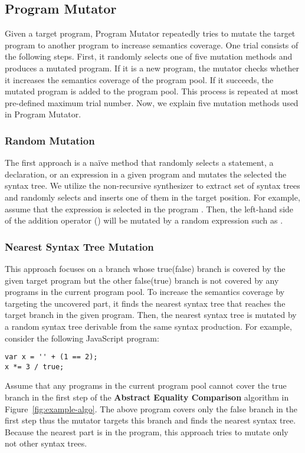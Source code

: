 \subsection{Program Mutator}

Given a target program, \textsf{Program Mutator} repeatedly tries to mutate the
target program to another program to increase semantics coverage.  One trial
consists of the following steps.  First, it randomly selects one of five
mutation methods and produces a mutated program.  If it is a new program, the
mutator checks whether it increases the semantics coverage of the program pool.
If it succeeds, the mutated program is added to the program pool.  This process
is repeated at most pre-defined maximum trial number.  Now, we explain five
mutation methods used in \textsf{Program Mutator}.


\subsubsection{Random Mutation}
The first approach is a na\"ive method that randomly selects a statement, a
declaration, or an expression in a given program and mutates the selected the
syntax tree.  We utilize the non-recursive synthesizer to extract set of syntax
trees and randomly selects and inserts one of them in the target position.
For example, assume that the expression  is selected in the program
.  Then, the left-hand side of the addition operator
(\code{+}) will be mutated by a random expression such as .


\subsubsection{Nearest Syntax Tree Mutation}
This approach focuses on a branch whose true(false) branch is covered by the
given target program but the other false(true) branch is not covered by any
programs in the current program pool.  To increase the semantics coverage by
targeting the uncovered part, it finds the nearest syntax tree that reaches the
target branch in the given program.  Then, the nearest syntax tree is mutated by
a random syntax tree derivable from the same syntax production.  For example,
consider the following JavaScript program:
\begin{lstlisting}[style=myJSstyle]
var x = '' + (1 == 2);
x *= 3 / true;
\end{lstlisting}
Assume that any programs in the current program pool cannot cover the true
branch in the first step of the \textbf{Abstract Equality Comparison} algorithm
in Figure~\ref{fig:example-algo}.  The above program covers only the false
branch in the first step thus the mutator targets this branch and finds the
nearest syntax tree.  Because the nearest part is  in the program,
this approach tries to mutate only  not other syntax trees.


